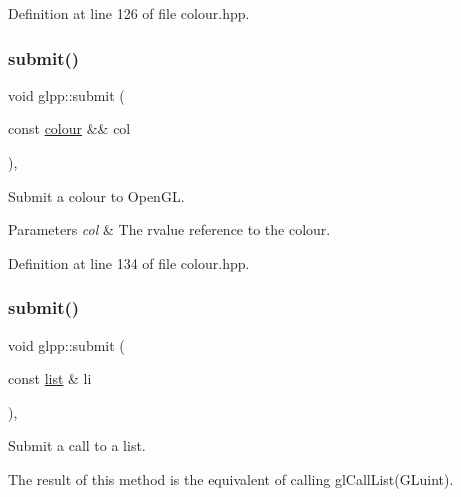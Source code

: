 Definition at line 126 of file colour.\+hpp.

\mbox{\label{namespaceglpp_aec91ff4a18d3b9693114f8774bd9c561}} 
\subsubsection{\texorpdfstring{submit()}{submit()}\hspace{0.1cm}{\footnotesize\ttfamily [2/4]}}
{\footnotesize\ttfamily void glpp\+::submit (\begin{DoxyParamCaption}\item[{const \hyperlink{classglpp_1_1colour}{colour} \&\&}]{col }\end{DoxyParamCaption})\hspace{0.3cm}{\ttfamily [inline]}, {\ttfamily [noexcept]}}



Submit a colour to Open\+GL. 


\begin{DoxyParams}{Parameters}
{\em col} & The rvalue reference to the colour. \\
\hline
\end{DoxyParams}


Definition at line 134 of file colour.\+hpp.

\mbox{\label{namespaceglpp_ac7ca6d6fd3cefa6019165db681480332}} 
\subsubsection{\texorpdfstring{submit()}{submit()}\hspace{0.1cm}{\footnotesize\ttfamily [3/4]}}
{\footnotesize\ttfamily void glpp\+::submit (\begin{DoxyParamCaption}\item[{const \hyperlink{classglpp_1_1list}{list} \&}]{li }\end{DoxyParamCaption})\hspace{0.3cm}{\ttfamily [inline]}, {\ttfamily [noexcept]}}



Submit a call to a list. 

The result of this method is the equivalent of calling gl\+Call\+List(\+G\+Luint).


